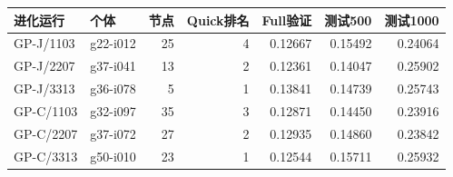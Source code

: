 \begin{tabular}{@{}llrrrrr@{}}
\toprule
进化运行 & 个体 & 节点 & Quick排名 & Full验证 & 测试500 & 测试1000 \\ \midrule
GP-J/1103 & g22-i012 & 25 & 4 & 0.12667 & 0.15492 & 0.24064 \\
GP-J/2207 & g37-i041 & 13 & 2 & 0.12361 & 0.14047 & 0.25902 \\
GP-J/3313 & g36-i078 & 5 & 1 & 0.13841 & 0.14739 & 0.25743 \\
GP-C/1103 & g32-i097 & 35 & 3 & 0.12871 & 0.14450 & 0.23916 \\
GP-C/2207 & g37-i072 & 27 & 2 & 0.12935 & 0.14860 & 0.23842 \\
GP-C/3313 & g50-i010 & 23 & 1 & 0.12544 & 0.15711 & 0.25932 \\
\bottomrule
\end{tabular}
